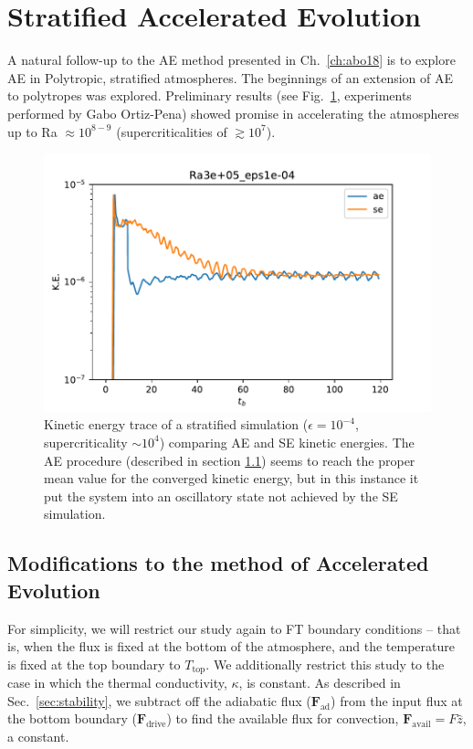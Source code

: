 \section{Stratified Accelerated Evolution}
\label{sec:stratified_ae}
A natural follow-up to the AE method presented in Ch.~\ref{ch:abo18} is to explore AE in Polytropic, stratified atmospheres.
The beginnings of an extension of AE to polytropes was explored.
Preliminary results (see Fig.~\ref{fig:gabo_ae}, experiments performed by Gabo Ortiz-Pena) showed promise in accelerating the atmospheres up to Ra $\approx 10^{8-9}$ (supercriticalities of $\gtrsim 10^7$).


\begin{figure}[t!]
    \includegraphics[width=\textwidth]{figs/unpublished/gabo_ae.pdf}
    \caption[Timeseries of kinetic energy in stratified AE vs.~SE.]{
	Kinetic energy trace of a stratified simulation ($\epsilon = 10^{-4}$, supercriticality $\sim 10^4$) comparing AE and SE kinetic energies.
	The AE procedure (described in section \ref{sec:ae}) seems to reach the proper mean value for the converged kinetic energy, but in this instance it put the system into an oscillatory state not achieved by the SE simulation.
    \label{fig:gabo_ae} }
\end{figure}




\subsection{Modifications to the method of Accelerated Evolution}
\label{sec:ae}
For simplicity, we will restrict our study again to FT boundary conditions -- that is, when the flux is fixed at the bottom of the atmosphere, and the temperature is fixed at the top boundary to $T_{\text{top}}$.
We additionally restrict this study to the case in which the thermal conductivity, $\kappa$, is constant.
As described in Sec.~\ref{sec:stability}, we subtract off the adiabatic flux ($\bm{F}_{\text{ad}}$) from the input flux at the bottom boundary ($\bm{F}_{\text{drive}}$) to find the available flux for convection, $\bm{F}_{\text{avail}} = F \hat{z}$, a constant.

